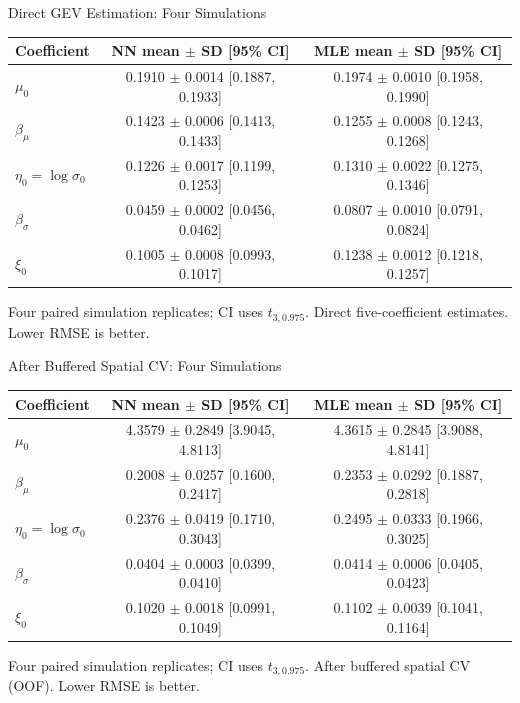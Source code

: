 \begin{frame}{Direct GEV Estimation: Four Simulations}
\centering\scriptsize
\begin{tabular}{lcc}
\toprule
Coefficient & NN mean $\pm$ SD [95\% CI] & MLE mean $\pm$ SD [95\% CI] \\
\midrule
$\mu_0$ & 0.1910 $\pm$ 0.0014 [0.1887, 0.1933] & 0.1974 $\pm$ 0.0010 [0.1958, 0.1990] \\
$\beta_\mu$ & 0.1423 $\pm$ 0.0006 [0.1413, 0.1433] & 0.1255 $\pm$ 0.0008 [0.1243, 0.1268] \\
$\eta_0=\log\sigma_0$ & 0.1226 $\pm$ 0.0017 [0.1199, 0.1253] & 0.1310 $\pm$ 0.0022 [0.1275, 0.1346] \\
$\beta_\sigma$ & 0.0459 $\pm$ 0.0002 [0.0456, 0.0462] & 0.0807 $\pm$ 0.0010 [0.0791, 0.0824] \\
$\xi_0$ & 0.1005 $\pm$ 0.0008 [0.0993, 0.1017] & 0.1238 $\pm$ 0.0012 [0.1218, 0.1257] \\
\bottomrule
\end{tabular}
\medskip
{\footnotesize Four paired simulation replicates; CI uses $t_{3,0.975}$. Direct five-coefficient estimates. Lower RMSE is better.}
\end{frame}

\begin{frame}{After Buffered Spatial CV: Four Simulations}
\centering\scriptsize
\begin{tabular}{lcc}
\toprule
Coefficient & NN mean $\pm$ SD [95\% CI] & MLE mean $\pm$ SD [95\% CI] \\
\midrule
$\mu_0$ & 4.3579 $\pm$ 0.2849 [3.9045, 4.8113] & 4.3615 $\pm$ 0.2845 [3.9088, 4.8141] \\
$\beta_\mu$ & 0.2008 $\pm$ 0.0257 [0.1600, 0.2417] & 0.2353 $\pm$ 0.0292 [0.1887, 0.2818] \\
$\eta_0=\log\sigma_0$ & 0.2376 $\pm$ 0.0419 [0.1710, 0.3043] & 0.2495 $\pm$ 0.0333 [0.1966, 0.3025] \\
$\beta_\sigma$ & 0.0404 $\pm$ 0.0003 [0.0399, 0.0410] & 0.0414 $\pm$ 0.0006 [0.0405, 0.0423] \\
$\xi_0$ & 0.1020 $\pm$ 0.0018 [0.0991, 0.1049] & 0.1102 $\pm$ 0.0039 [0.1041, 0.1164] \\
\bottomrule
\end{tabular}
\medskip
{\footnotesize Four paired simulation replicates; CI uses $t_{3,0.975}$. After buffered spatial CV (OOF). Lower RMSE is better.}
\end{frame}

